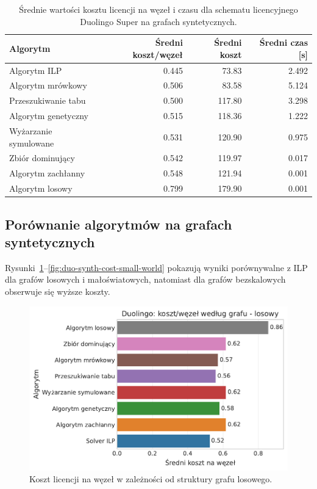 \begin{table}[H]
  \centering
  \caption{Średnie wartości kosztu licencji na węzeł i czasu dla schematu licencyjnego Duolingo Super na grafach syntetycznych.}
  \label{tab:duo-synth-summary}
  \begin{tabular}{lrrr}
    \toprule
    \textbf{Algorytm}     & \textbf{Średni koszt/węzeł} & \textbf{Średni koszt} & \textbf{Średni czas [s]} \\
    \midrule
    Algorytm ILP          & 0.445                       & 73.83                 & 2.492                    \\
    Algorytm mrówkowy     & 0.506                       & 83.58                 & 5.124                    \\
    Przeszukiwanie tabu   & 0.500                       & 117.80                & 3.298                    \\
    Algorytm genetyczny   & 0.515                       & 118.36                & 1.222                    \\
    Wyżarzanie symulowane & 0.531                       & 120.90                & 0.975                    \\
    Zbiór dominujący      & 0.542                       & 119.97                & 0.017                    \\
    Algorytm zachłanny    & 0.548                       & 121.94                & 0.001                    \\
    Algorytm losowy       & 0.799                       & 179.90                & 0.001                    \\
    \bottomrule
  \end{tabular}
\end{table}


\subsection{Porównanie algorytmów na grafach syntetycznych}

Rysunki~\ref{fig:duo-synth-cost-random}--\ref{fig:duo-synth-cost-small-world} pokazują wyniki porównywalne z ILP dla grafów losowych i małoświatowych, natomiast dla grafów bezskalowych obserwuje się wyższe koszty.


\begin{figure}[H]
  \centering
  \includegraphics[width=0.65\linewidth]{assets/figures/benchmark/synthetic/duolingo_cost_per_node_by_graph_random.pdf}
  \caption{Koszt licencji na węzeł w zależności od struktury grafu losowego.}
  \label{fig:duo-synth-cost-random}
\end{figure}

